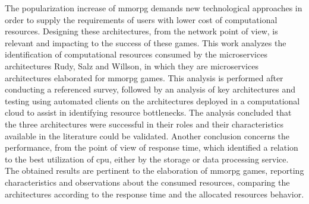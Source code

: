 The popularization increase of \acf{mmorpg} demands new technological approaches in order to supply the requirements of users with lower cost of computational resources.
%
Designing these architectures, from the network point of view, is relevant and impacting to the success of these games.
%
This work analyzes the identification of computational resources consumed by the microservices architectures Rudy, Salz and Willson, in which they are microservices architectures elaborated for \ac{mmorpg} games.
%
This analysis is performed after conducting a referenced survey, followed by an analysis of key architectures and testing using automated clients on the architectures deployed in a computational cloud to assist in identifying resource bottlenecks.
%
The analysis concluded that the three architectures were successful in their roles and their characteristics available in the literature could be validated.
%
Another conclusion concerns the performance, from the point of view of response time, which identified a relation to the best utilization of \ac{cpu}, either by the storage or data processing service.
%
The obtained results are pertinent to the elaboration of \ac{mmorpg} games, reporting characteristics and observations about the consumed resources, comparing the architectures according to the response time and the allocated resources behavior.
%
